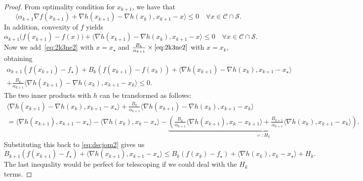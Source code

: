 \documentclass[a4paper]{article}
\renewcommand{\leq}{\leqslant}
\newcommand{\CC}{\mathcal{C}}
\renewcommand{\SS}{\mathcal{S}}
\newcommand{\ip}[2]{\langle #1, #2\rangle}
\begin{document}
\begin{proof}
        From optimality condition for $x_{k+1}$, we have that
        \begin{equation}\label{eq:12e1dq2}
                \ip{\alpha_{k+1} \nabla f(x_{k+1}) + \nabla h(x_{k+1}) - \nabla h(x_k)}{ x_{k+1}-x}\leq 0 \quad \forall x\in  \CC\cap\SS.
        \end{equation}
        In addition, convexity of $f$ yields
        \begin{equation}\label{eq:2k3ne2}
                \alpha_{k+1}  \bigl(f(x_{k+1}) - f(x)\bigr) + \ip{\nabla h(x_{k+1}) - \nabla h(x_k)}{ x_{k+1}-x}\leq 0 \quad \forall x\in \CC\cap\SS.
        \end{equation}  
        Now we add~\eqref{eq:2k3ne2} with $x = x_\star$ and $\frac{B_{k}}{\alpha_{k+1}}\times\eqref{eq:2k3ne2}$ with $x = x_k$, obtaining
        \begin{multline}\label{eq:dscjom2}
                \alpha_{k+1}\left(f(x_{k+1})-f_\star\right) + B_k\left(f(x_{k+1})-f(x_k)\right)
                                                                          + \ip{\nabla h(x_{k+1}) - \nabla h(x_k)}{ x_{k+1}-x_\star} \\
                                                                        + \frac{B_k}{\alpha_{k+1}}\ip{\nabla h(x_{k+1}) - \nabla h(x_k)}{ x_{k+1}-x_k}\leq 0.
        \end{multline}
        The two inner products with $h$ can be transformed as follows:
        \begin{multline*}
                \ip{\nabla h(x_{k+1}) - \nabla h(x_k)}{ x_{k+1}-x_\star} + \frac{B_k}{\alpha_{k+1}}\ip{\nabla h(x_{k+1}) - \nabla h(x_k)}{ x_{k+1}-x_k} \\
                =
                \ip{\nabla h(x_{k+1})}{ x_{k+1}-x_\star} -  \ip{\nabla h(x_{k})}{ x_{k}-x_\star} - \underbrace{\left(\frac{B_k}{\alpha_{k+1}}\ip{\nabla h(x_{k+1})}{ x_k - x_{k+1}} +\frac{B_{k+1}}{\alpha_{k+1}}                            \ip{\nabla h(x_k)}{ x_{k+1} - x_{k}}\right)}_{=:H_k}.
        \end{multline*}
        Substituting this back to \eqref{eq:dscjom2} gives us
        \begin{equation}\label{eq:lask2}
                B_{k+1} \left(f(x_{k+1})-f_\star\right) + \ip{\nabla h(x_{k+1})}{ x_{k+1}-x_\star}  \leq  B_k\left(f(x_{k})-f_\star\right) + \ip{\nabla h(x_{k})}{ x_{k}-x_\star} + H_k.
        \end{equation}
        The last inequality would be perfect for telescoping if we could deal with the $H_k$ terms.

\end{proof}
\end{document}
